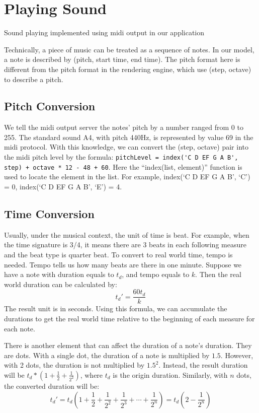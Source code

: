 \chapter{Playing Sound}

\label{Chapter:Playing-Sound}

Sound playing implemented using midi output in our application 

Technically, a piece of music can be treated as a sequence of notes. In our model, a note is described by (pitch, start time, end time).
The pitch format here is different from the pitch format in the rendering engine, which use (step, octave) to describe a pitch.

\section{Pitch Conversion}
We tell the midi output server the notes' pitch by a number ranged from 0 to 255. The standard sound A4, with pitch 440Hz, is represented by 
value 69 in the midi protocol. With this knowledge, we can convert the (step, octave) pair into the midi pitch level by the formula:
\verb|pitchLevel = index('C D EF G A B', step) + octave * 12 - 48 + 60|. Here the ``index(list, element)'' function is used to locate the 
element in the list. For example, index(`C D EF G A B', `C') = 0, index(`C D EF G A B', `E') = 4.

\section{Time Conversion}
Usually, under the musical context, the unit of time is beat. For example, when the time signature is 3/4, it means there are 3 beats in each following
measure and the beat type is quarter beat. To convert to real world time, tempo is needed. Tempo tells us how many beats are there in one minute.
Suppose we have a note with duration equals to $t_d$, and tempo equals to $k$. Then the real world duration can be calculated by:
\[
t_d' = \frac{60 t_d}{k}
\]
The result unit is in seconds. Using this formula, we can accumulate the durations
to get the real world time relative to the beginning of each measure for each note.  

There is another element that can affect the duration of a note's duration. They 
are dots. With a single dot, the duration of a note is multiplied by $1.5$. However, 
with 2 dots, the duration is not multiplied by $1.5^2$. Instead, the result duration 
will be $t_d * (1 + \frac{1}{2} + \frac{1}{2^2})$, where $t_d$ is the origin duration.
Similarly, with $n$ dots, the converted duration will be:
\[
    t_d' = t_d \left(1 + \frac{1}{2} + \frac{1}{2^2} + \frac{1}{2^3} + \cdots + \frac{1}{2^n}\right)
         = t_d \left(2 - \frac{1}{2^n}\right)
\]

